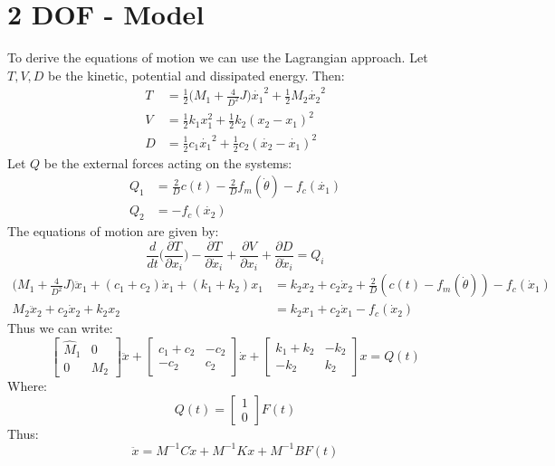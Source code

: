 \section{2 DOF - Model}
To derive the equations of motion we can use the Lagrangian approach. Let $T,V,D$ be the kinetic, potential and dissipated energy. Then:
\begin{align*}
T  &= \frac{1}{2} \Big(M_1 + \frac{4}{D^2}J \Big) \dot{x_1}^2 + \frac{1}{2}M_2 \dot{x_2}^2 \\
V &= \frac{1}{2}k_1x_1^2 + \frac{1}{2}k_2(x_2-x_1)^2 \\
D &= \frac{1}{2}c_1\dot{x_1}^2 + \frac{1}{2}c_2(\dot{x_2}-\dot{x_1})^2
\end{align*}
Let $Q$ be the external forces acting on the systems:
\begin{align*}
Q_1 &= \frac{2}{D}c(t) - \frac{2}{D}f_m(\dot{\theta}) - f_c(\dot{x_1}) \\
Q_2 &=  - f_c(\dot{x_2})
\end{align*}
The equations of motion are given by:
$$\frac{d}{dt}\Big(\frac{\partial T}{\partial x_i} \Big) -\frac{\partial T}{\partial \dot{x}_i} + \frac{\partial V}{\partial x_i} + \frac{\partial D}{\partial \dot{x}_i} = Q_i$$
\begin{align*}
\Big(M_1+\frac{4}{D^2}J \Big)\ddot{x}_1+(c_1+c_2)\dot{x}_1 +(k_1+k_2)x_1 &= k_2 x_2 +c_2 \dot{x}_2 + \frac{2}{D}(c(t)-f_m(\dot{\theta}))-f_c(\dot{x}_1) \\
M_2 \ddot{x}_2 +c_2 \dot{x}_2 +k_2x_2 &= k_2x_1+c_2\dot{x}_1 -f_c(\dot{x}_2)
\end{align*}
Thus we can write:
$$
\begin{bmatrix}
\hat{M}_1 & 0 \\
0 & M_2
\end{bmatrix}
\ddot{x} + 
\begin{bmatrix}
c_1+c_2 & -c_2 \\
-c_2 & c_2
\end{bmatrix}
\dot{x}+
\begin{bmatrix}
k_1+k_2 & -k_2 \\
-k_2 &k_2
\end{bmatrix}
x =Q(t)$$
Where:
$$Q(t)=\begin{bmatrix}1 \\ 0 \end{bmatrix} F(t)$$
Thus:
$$\ddot{x} = M^{-1}C\dot{x}+M^{-1}Kx+ M^{-1}BF(t)$$
